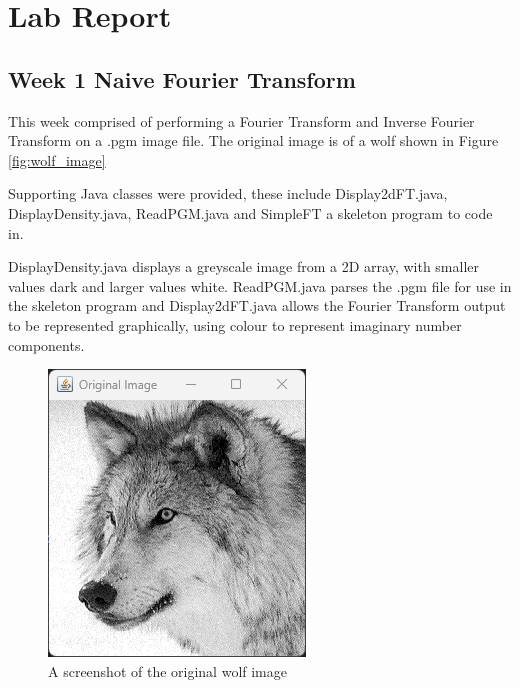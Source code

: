 \chapter{Lab Report}
\section{Week 1 Naive Fourier Transform}
    This week comprised of performing a Fourier Transform and Inverse Fourier Transform on a .pgm image file. The original image is of a wolf shown in Figure \autoref{fig:wolf_image}

    Supporting Java classes were provided, these include Display2dFT.java, DisplayDensity.java, ReadPGM.java and SimpleFT a skeleton program to code in.

    DisplayDensity.java displays a greyscale image from a 2D array, with smaller values dark and larger values white. ReadPGM.java parses the .pgm file for use in the skeleton program and Display2dFT.java allows the Fourier Transform output to be represented graphically, using colour to represent imaginary number components.
    
    \begin{figure}[H]
        \centering
        \includegraphics[width=0.8\columnwidth]{Figures/Week 1/W1-Wolf-Original.png}
        \caption{A screenshot of the original wolf image}
        \label{fig:wolf_image}
        
    \end{figure}
    

